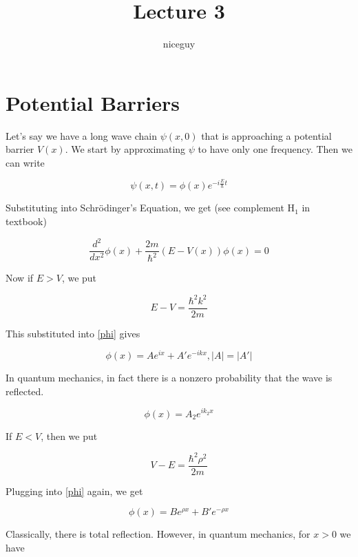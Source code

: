 \documentclass[12pt]{article}
\title{Lecture 3}
\author{niceguy}
\begin{document}
\maketitle

\section{Potential Barriers}

Let's say we have a long wave chain $\psi(x,0)$ that is approaching a potential barrier $V(x)$. We start by approximating $\psi$ to have only one frequency. Then we can write

\begin{equation}
    \psi(x,t) = \phi(x)e^{-i\frac{E}{\hbar}t}
\end{equation}

Substituting into Schr\"odinger's Equation, we get (see complement H$_1$ in textbook)

\begin{equation}\label{phi}
    \frac{d^2}{dx^2}\phi(x) + \frac{2m}{\hbar^2} (E - V(x))\phi(x) = 0
\end{equation}

Now if $E>V$, we put

\begin{equation}
    E - V = \frac{\hbar^2k^2}{2m}
\end{equation}

This substituted into \ref{phi} gives

\begin{equation}\label{biggerV}
    \phi(x) = Ae^{ix} + A'e^{-ikx}, |A| = |A'|
\end{equation}

In quantum mechanics, in fact there is a nonzero probability that the wave is reflected.

\begin{equation}
    \phi(x) = A_2e^{ik_2x}
\end{equation}

If $E<V$, then we put

\begin{equation}
    V - E = \frac{\hbar^2\rho^2}{2m}
\end{equation}

Plugging into \ref{phi} again, we get

\begin{equation}
    \phi(x) = Be^{\rho x} + B'e^{-\rho x}
\end{equation}

Classically, there is total reflection. However, in quantum mechanics, for $x>0$ we have
\end{document}
